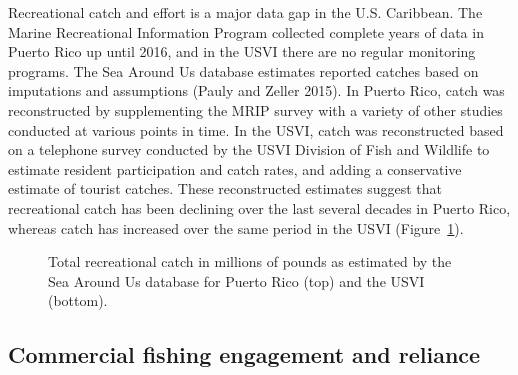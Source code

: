 \documentclass[
  letterpaper,
  oneside,
  open=any]{scrbook}
\begin{document}
Recreational catch and effort is a major data gap in the U.S. Caribbean.
The Marine Recreational Information Program collected complete years of
data in Puerto Rico up until 2016, and in the USVI there are no regular
monitoring programs. The Sea Around Us database estimates reported
catches based on imputations and assumptions (Pauly and Zeller 2015). In
Puerto Rico, catch was reconstructed by supplementing the MRIP survey
with a variety of other studies conducted at various points in time. In
the USVI, catch was reconstructed based on a telephone survey conducted
by the USVI Division of Fish and Wildlife to estimate resident
participation and catch rates, and adding a conservative estimate of
tourist catches. These reconstructed estimates suggest that recreational
catch has been declining over the last several decades in Puerto Rico,
whereas catch has increased over the same period in the USVI
(Figure~\ref{fig-reccatch}).

\begin{figure}


\caption{\label{fig-reccatch}Total recreational catch in millions of
pounds as estimated by the Sea Around Us database for Puerto Rico (top)
and the USVI (bottom).}

\end{figure}%

\subsection{Commercial fishing engagement and
reliance}\label{commercial-fishing-engagement-and-reliance}
\end{document}
